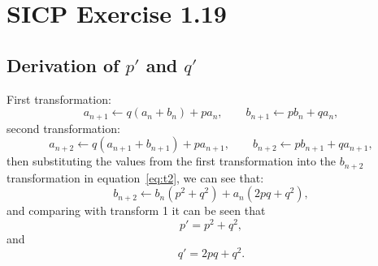 \documentclass{article}
\author{J L Kaplan}
\begin{document}
\section*{SICP Exercise 1.19}

\subsection*{Derivation of $p'$ and $q'$}
First transformation:
\begin{equation}
  a_{n+1} \leftarrow q \left( a_n + b_n \right) + p a_n, \qquad b_{n+1} \leftarrow p b_n + q a_n,
\end{equation}
second transformation:
\begin{equation}
  \label{eq:t2}
  a_{n+2} \leftarrow q \left( a_{n+1} + b_{n+1} \right) + p a_{n+1}, \qquad b_{n+2} \leftarrow p b_{n+1} + q a_{n+1},
\end{equation}
then substituting the values from the first transformation into the $b_{n+2}$ transformation in equation~\ref{eq:t2}, we can see that:
\begin{equation}
  b_{n+2} \leftarrow b_n \left( p^2 + q^2 \right) + a_n \left( 2pq + q^2 \right),
\end{equation}
and comparing with transform 1 it can be seen that
\begin{equation}
  p' = p^2 + q^2,
\end{equation}
and
\begin{equation}
  q' = 2pq + q^2.
\end{equation}
\end{document}
